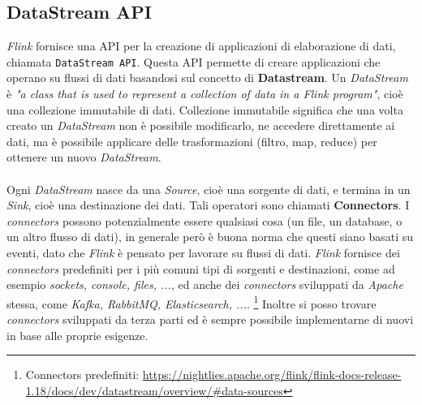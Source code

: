 \subsection{DataStream API}
\label{subsec:datastream_api}
\textit{Flink} fornisce una API per la creazione di applicazioni di elaborazione di dati, chiamata \texttt{DataStream API}.
Questa API permette di creare applicazioni che operano su flussi di dati basandosi sul concetto di \textbf{Datastream}.
Un \textit{DataStream} è \textit{"a class that is used to represent a collection of data in a Flink program"}\cite{flinkwebsite}, cioè una collezione 
immutabile di dati. Collezione immutabile significa che una volta creato un \textit{DataStream} non è possibile modificarlo, ne accedere direttamente ai dati,
ma è possibile applicare delle trasformazioni (filtro, map, reduce) per ottenere un nuovo \textit{DataStream}.\\\\
Ogni \textit{DataStream} nasce da una \textit{Source}, cioè una sorgente di dati, e termina in un \textit{Sink}, cioè una destinazione dei dati. 
Tali operatori sono chiamati \textbf{Connectors}.
I \textit{connectors} possono potenzialmente essere qualsiasi cosa (un file, un database, o un altro flusso di dati), 
in generale però è buona norma che questi siano basati su eventi, dato che \textit{Flink} è pensato per lavorare su flussi di dati.
\textit{Flink} fornisce dei \textit{connectors} predefiniti per i più comuni tipi di sorgenti e destinazioni, come ad esempio \textit{sockets, console, files, ...},
ed anche dei \textit{connectors} sviluppati da \textit{Apache} stessa, come \textit{Kafka, RabbitMQ, Elasticsearch, ...}. 
\footnote{Connectors predefiniti: \url{https://nightlies.apache.org/flink/flink-docs-release-1.18/docs/dev/datastream/overview/\#data-sources}}
Inoltre si posso trovare \textit{connectors} sviluppati da terza parti ed è sempre possibile implementarne di nuovi in base alle proprie esigenze.  


